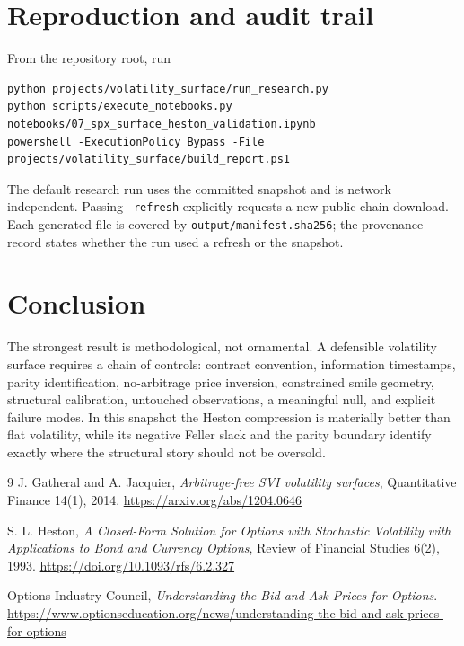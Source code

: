 \documentclass[11pt,oneside]{article}
\begin{document}
\section{Reproduction and audit trail}

From the repository root, run
\begin{verbatim}
python projects/volatility_surface/run_research.py
python scripts/execute_notebooks.py notebooks/07_spx_surface_heston_validation.ipynb
powershell -ExecutionPolicy Bypass -File projects/volatility_surface/build_report.ps1
\end{verbatim}
The default research run uses the committed snapshot and is network independent.
Passing \texttt{--refresh} explicitly requests a new public-chain download. Each
generated file is covered by \texttt{output/manifest.sha256}; the provenance record
states whether the run used a refresh or the snapshot.

\section{Conclusion}

The strongest result is methodological, not ornamental. A defensible volatility
surface requires a chain of controls: contract convention, information timestamps,
parity identification, no-arbitrage price inversion, constrained smile geometry,
structural calibration, untouched observations, a meaningful null, and explicit
failure modes. In this snapshot the Heston compression is materially better than
flat volatility, while its negative Feller slack and the parity boundary identify
exactly where the structural story should not be oversold.

\begin{thebibliography}{9}
J. Gatheral and A. Jacquier,
\emph{Arbitrage-free SVI volatility surfaces}, Quantitative Finance 14(1), 2014.
\url{https://arxiv.org/abs/1204.0646}

S. L. Heston,
\emph{A Closed-Form Solution for Options with Stochastic Volatility with
Applications to Bond and Currency Options}, Review of Financial Studies 6(2), 1993.
\url{https://doi.org/10.1093/rfs/6.2.327}

Options Industry Council,
\emph{Understanding the Bid and Ask Prices for Options}.
\url{https://www.optionseducation.org/news/understanding-the-bid-and-ask-prices-for-options}
\end{thebibliography}
\end{document}
